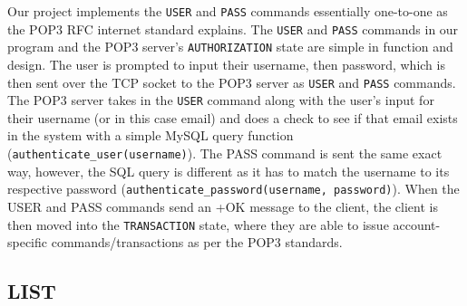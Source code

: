 \documentclass[12pt]{article}
\begin{document}
Our project implements the \texttt{USER} and \texttt{PASS} commands essentially one-to-one as the POP3 RFC internet standard explains. The \texttt{USER} and \texttt{PASS} commands in our program and the POP3 server’s \texttt{AUTHORIZATION} state are simple in function and design. The user is prompted to input their username, then password, which is then sent over the TCP socket to the POP3 server as \texttt{USER} and \texttt{PASS} commands. The POP3 server takes in the \texttt{USER} command along with the user’s input for their username (or in this case email) and does a check to see if that email exists in the system with a simple MySQL query function (\texttt{authenticate\_user(username)}). The PASS command is sent the same exact way, however, the SQL query is different as it has to match the username to its respective password (\texttt{authenticate\_password(username, password)}). When the USER and PASS commands send an +OK message to the client, the client is then moved into the \texttt{TRANSACTION} state, where they are able to issue account-specific commands/transactions as per the POP3 standards.

\subsection{LIST}
\end{document}
